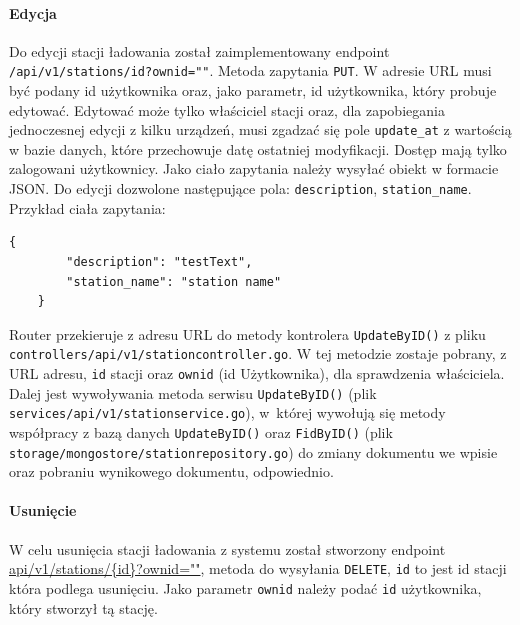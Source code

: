 \paragraph{Edycja\newline}
Do edycji stacji ładowania został zaimplementowany endpoint \texttt{/api/v1/stations/{id}?ownid=""}.
Metoda zapytania \texttt{PUT}.
W adresie URL musi być podany id użytkownika oraz, jako parametr, id użytkownika, który probuje edytować. Edytować może tylko właściciel stacji oraz, dla zapobiegania jednoczesnej edycji z kilku urządzeń, musi zgadzać się pole \texttt{update\_at} z wartością w bazie danych, które przechowuje datę ostatniej modyfikacji.
Dostęp mają tylko zalogowani użytkownicy.
Jako ciało zapytania należy wysyłać obiekt w formacie JSON. Do edycji dozwolone następujące pola: \texttt{description}, \texttt{station\_name}.
Przykład ciała zapytania:
\begin{lstlisting}[basicstyle=\tiny\ttfamily]
    {
		"description": "testText",
		"station_name": "station name"
    }
\end{lstlisting}

Router przekieruje z adresu URL do metody kontrolera \texttt{UpdateByID()} z pliku \texttt{controllers/api/v1/stationcontroller.go}.
W tej metodzie zostaje pobrany, z URL adresu, \texttt{id} stacji oraz \texttt{ownid} (id Użytkownika), dla sprawdzenia właściciela.
Dalej jest wywoływania metoda serwisu \texttt{UpdateByID()} (plik \texttt{services/api/v1/stationservice.go}), w~której wywołują się metody współpracy z bazą danych \texttt{UpdateByID()} oraz \texttt{FidByID()} (plik \texttt{storage/mongostore/stationrepository.go}) do zmiany dokumentu we wpisie oraz pobraniu wynikowego dokumentu, odpowiednio.


\paragraph{Usunięcie\newline}
W celu usunięcia stacji ładowania z systemu został stworzony endpoint \url{api/v1/stations/{id}?ownid=""}, metoda do wysyłania \texttt{DELETE}, \texttt{{id}} to jest id stacji która podlega usunięciu. Jako parametr \texttt{ownid} należy podać \texttt{id} użytkownika, który stworzył tą stację.

